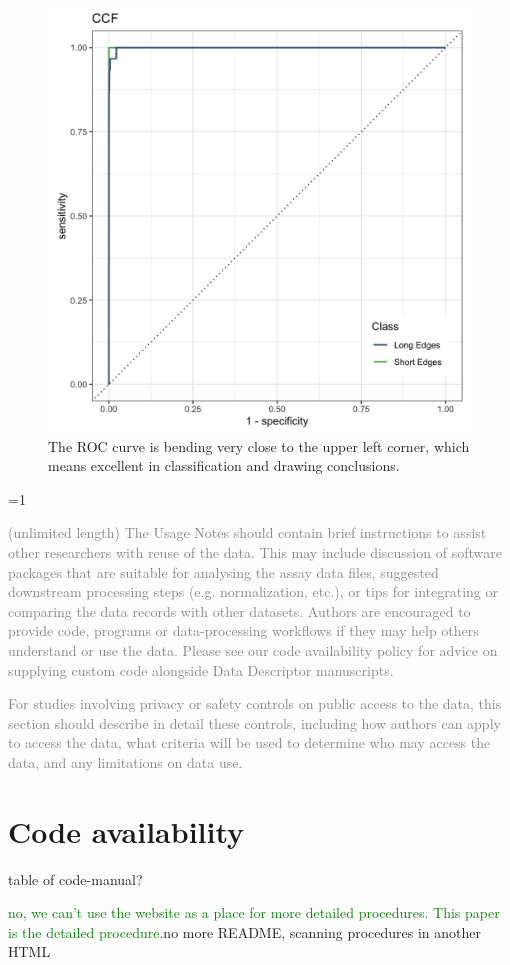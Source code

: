 \documentclass[fleqn,10pt]{wlscirep}
\newcommand{\tom}[1]{{\textcolor{RedOrange}{#1}}}
\newcommand{\hh}[1]{{\textcolor{Green}{#1}}}
\newcommand{\ifinstruction}{0} %
\begin{document}
\begin{figure}[ht]
\centering
\includegraphics[width=0.5\linewidth]{ccf_ROC.png}
\caption{The ROC curve is bending very close to the upper left corner, which means excellent in classification and drawing conclusions.}
\label{fig-ccf-ROC}
\end{figure}

\ifnum \ifinstruction=1

\textcolor{gray}{(unlimited length) The Usage Notes should contain brief instructions to assist other researchers with reuse of the data. This may include discussion of software packages that are suitable for analysing the assay data files, suggested downstream processing steps (e.g. normalization, etc.), or tips for integrating or comparing the data records with other datasets. Authors are encouraged to provide code, programs or data-processing workflows if they may help others understand or use the data. Please see our code availability policy for advice on supplying custom code alongside Data Descriptor manuscripts.}

\textcolor{gray}{For studies involving privacy or safety controls on public access to the data, this section should describe in detail these controls, including how authors can apply to access the data, what criteria will be used to determine who may access the data, and any limitations on data use.}
\fi

\section{Code availability}\label{sec-code-availability}

\tom{table of code-manual?}

\hh{no, we can't use the website as a place for more detailed procedures. This paper is the detailed procedure.}\tom{no more README, scanning procedures in another HTML}
\end{document}

